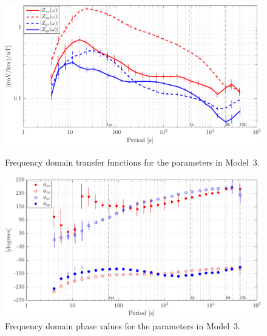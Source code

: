\documentclass[draft,linenumbers]{agujournal2018}
\begin{document}
\begin{figure}[h]
\centering
\includegraphics[width=\textwidth]{figures/plot_model_summary_Z_MT-options-1.pdf}
\caption{Frequency domain transfer functions for the parameters in Model~3.}
\label{Z_MT}

\vspace{4em}

\centering
\includegraphics[width=\textwidth]{figures/plot_model_summary_Phi_MT-options-1.pdf}
\caption{Frequency domain phase values for the parameters in Model~3.}
\label{Phi_MT}
\end{figure}

\clearpage


\end{document}
